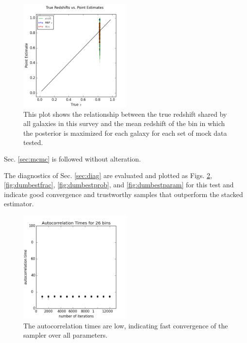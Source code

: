\documentclass[preprint]{aastex}
\begin{document}
\begin{figure}
\includegraphics[width=0.5\textwidth]{toy/truevmap.png}
\caption{This plot shows the relationship between the true redshift shared by all galaxies in this survey and the mean redshift of the bin in which the posterior is maximized for each galaxy for each set of mock data tested.}
\label{fig:toycat}
\end{figure}

Sec. \ref{sec:mcmc} is followed without alteration.

%

The diagnostics of Sec. \ref{sec:diag} are evaluated and plotted as Figs. \ref{fig:dumbestacor}, \ref{fig:dumbestfrac}, \ref{fig:dumbestprob}, and \ref{fig:dumbestparam} for this test and indicate good convergence and trustworthy samples that outperform the stacked estimator.

\begin{figure}
\includegraphics[width=0.5\textwidth]{times-toy.png}
\caption{The autocorrelation times are low, indicating fast convergence of the sampler over all parameters.}
\label{fig:dumbestacor}
\end{figure}
\end{document}
